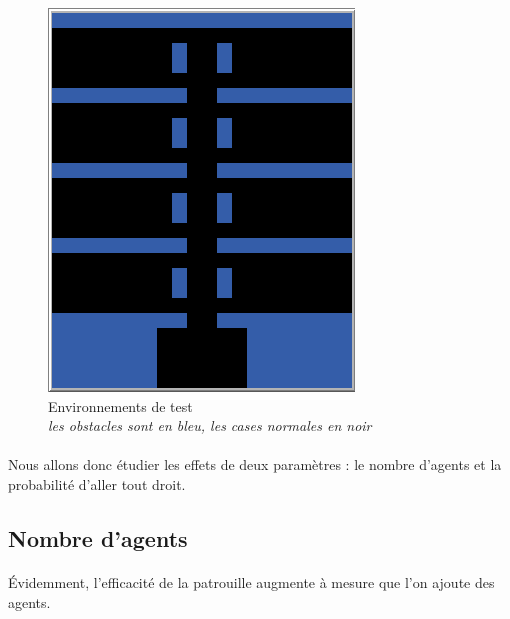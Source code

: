 \documentclass{article}
\begin{document}
\begin{figure}[!h]
\begin{center}
                \includegraphics[width = \textwidth/4]{corridor_png.PNG}
                \caption{Environnements de test \\ \textit{les obstacles sont en bleu, les cases normales en noir}}
            \end{center}
        \end{figure}

        \paragraph{} Nous allons donc étudier les effets de deux paramètres : le nombre d'agents et la probabilité d'aller tout droit.
    \subsection{Nombre d'agents}
        \paragraph{}Évidemment, l'efficacité de la patrouille augmente à mesure que l'on ajoute des agents.
\end{document}
